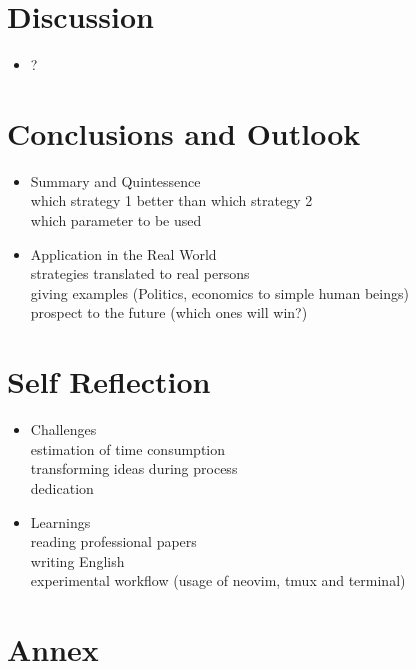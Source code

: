 \documentclass{article}
\begin{document}
\section{Discussion}
\begin{itemize}

	\item ?

\end{itemize}

\section{Conclusions and Outlook}
\begin{itemize}

	\item Summary and Quintessence\\
		which strategy 1 better than which strategy 2\\
		which parameter to be used\\

	\item Application in the Real World\\
		strategies translated to real persons\\
		giving examples (Politics, economics to simple human beings)\\
		prospect to the future (which ones will win?)

\end{itemize}

\section{Self Reflection}
\begin{itemize}

	\item Challenges\\
		estimation of time consumption\\
		transforming ideas during process\\
		dedication

	\item Learnings\\
		reading professional papers\\
		writing English\\
		experimental workflow (usage of neovim, tmux and terminal)

\end{itemize}

\section{Annex}
\end{document}
